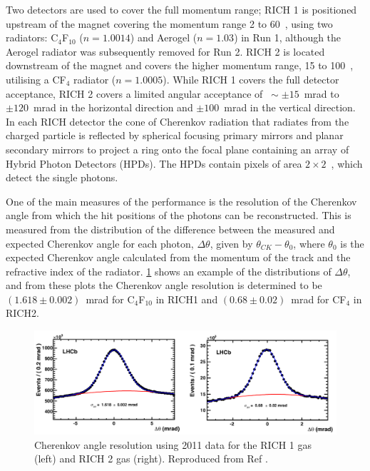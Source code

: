 Two \rich detectors are used to cover the full \lhcb momentum range; RICH 1 is positioned upstream of the magnet covering the momentum range 2 to 60~\gevc, using two radiators: C$_4$F$_{10}$ ($n = 1.0014$) and Aerogel ($n = 1.03$) in Run 1, although the Aerogel radiator was subsequently removed for Run 2. RICH 2 is located downstream of the magnet and covers the higher momentum range, 15 to 100~\gevc, utilising a CF$_4$ radiator ($n = 1.0005$). While RICH 1 covers the full detector acceptance, RICH 2 covers a limited angular acceptance of $~\sim \pm 15$~mrad to $\pm 120$~mrad in the horizontal direction and $\pm 100$~mrad in the vertical direction. In each RICH detector the cone of Cherenkov radiation that radiates from the charged particle is reflected by spherical focusing primary mirrors and planar secondary mirrors to project a ring onto the focal plane containing an array of Hybrid Photon Detectors (HPDs). The HPDs contain pixels of area $2\times 2$~\mma, which detect the single photons.

One of the main measures of the \rich performance is the resolution of the Cherenkov angle from which the hit positions of the photons can be reconstructed. This is measured from the distribution of the difference between the measured and expected Cherenkov angle for each photon, $\Delta\theta$, given by $\theta_{CK} - \theta_0$, where $\theta_0$ is the expected Cherenkov angle calculated from the momentum of the track and the refractive index of the radiator. \Fig\ref{cherenkov} shows an example of the distributions of $\Delta\theta$, and from these plots the Cherenkov angle resolution is determined to be $(1.618 \pm 0.002)$~mrad for C$_4$F$_{10}$ in RICH1 and $(0.68 \pm 0.02)$~mrad for CF$_4$ in RICH2.

\begin{figure}
\includegraphics[width=\linewidth]{figures/detector/cherenkov.pdf}
\caption{Cherenkov angle resolution using 2011 data for the RICH 1 gas (left) and RICH 2 gas (right). Reproduced from Ref \cite{LHCb-DP-2012-003}.}
\label{cherenkov}
\end{figure}

